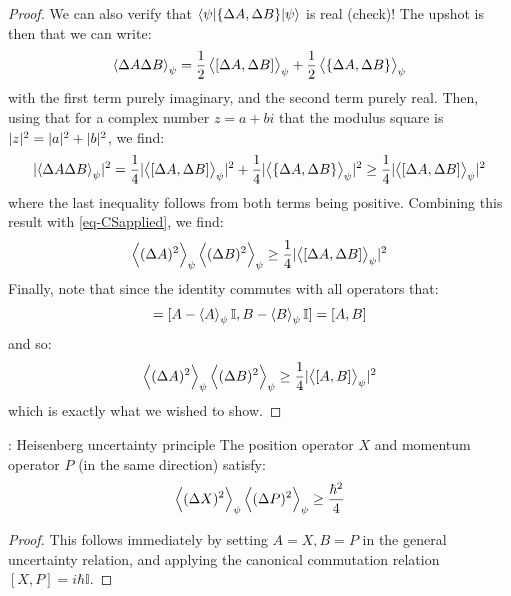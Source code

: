 \begin{proof}
    We can also verify that $\langle \psi \rvert\{\Delta A, \Delta B\}\lvert \psi \rangle$ is real (check)! The upshot is then that we can write:
    \begin{equation}
        \left< \Delta A\Delta B \right>_\psi = \frac{1}{2}\left< [\Delta A, \Delta B] \right>_\psi + \frac{1}{2}\left< \{\Delta A, \Delta B\} \right>_\psi
    \end{equation}
    with the first term purely imaginary, and the second term purely real. Then, using that for a complex number $z = a + bi$ that the modulus square is $\lvert z \rvert^2 = \lvert a \rvert^2 + \lvert b \rvert^2$, we find:
    \begin{equation}
        \lvert \left< \Delta A\Delta B \right>_\psi \rvert^2 = \frac{1}{4}\lvert \left< [\Delta A, \Delta B] \right>_\psi \rvert^2 + \frac{1}{4}\lvert \left< \{\Delta A, \Delta B\} \right>_\psi \rvert^2 \geq \frac{1}{4}\lvert \left< [\Delta A, \Delta B] \right>_\psi \rvert^2
    \end{equation}
    where the last inequality follows from both terms being positive. Combining this result with \eqref{eq-CSapplied}, we find:
    \begin{equation}
        \left< (\Delta A)^2 \right>_\psi\left< (\Delta B)^2 \right>_\psi \geq \frac{1}{4}\lvert \left< [\Delta A, \Delta B] \right>_\psi \rvert^2
    \end{equation}
    Finally, note that since the identity commutes with all operators that:
    \begin{equation}
        [\Delta A, \Delta B] = [A - \avg{A}_\psi \II, B - \avg{B}_\psi \II] = [A, B]
    \end{equation}
    and so:
    \begin{equation}
        \left< (\Delta A)^2 \right>_\psi\left< (\Delta B)^2 \right>_\psi \geq \frac{1}{4}\lvert \left< [A, B] \right>_\psi \rvert^2
    \end{equation}
    which is exactly what we wished to show.
\end{proof}

\begin{corbox}{: Heisenberg uncertainty principle}
    The position operator $X$ and momentum operator $P$ (in the same direction) satisfy:
    \begin{equation}
        \left< (\Delta X)^2 \right>_\psi\left< (\Delta P)^2 \right>_\psi \geq \frac{\hbar^2}{4}
    \end{equation}
\end{corbox}
\begin{proof}
    This follows immediately by setting $A = X, B = P$ in the general uncertainty relation, and applying the canonical commutation relation $[X, P] = i\hbar \mathbb{I}$. 
\end{proof}

